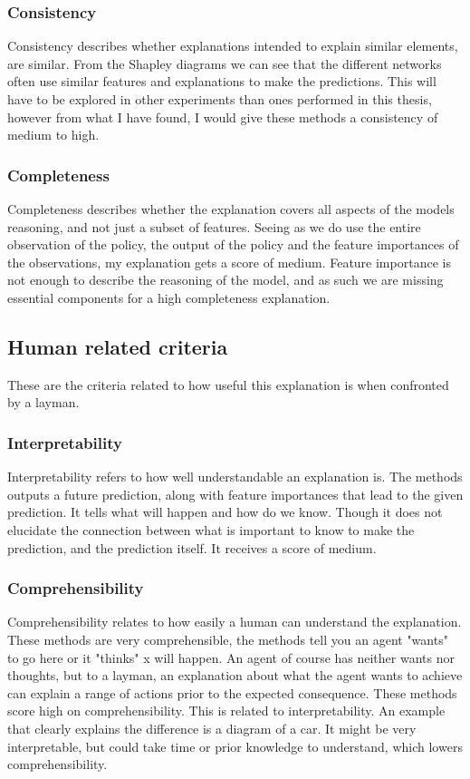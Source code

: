 \documentclass[UKenglish]{uiomasterthesis}
\begin{document}
\subsubsection{Consistency}
Consistency describes whether explanations intended to explain similar elements, are similar. From the Shapley diagrams we can see that the different networks often use similar features and explanations to make the predictions. This will have to be explored in other experiments than ones performed in this thesis, however from what I have found, I would give these methods a consistency of medium to high.

\subsubsection{Completeness}
Completeness describes whether the explanation covers all aspects of the models reasoning, and not just a subset of features. Seeing as we do use the entire observation of the policy, the output of the policy and the feature importances of the observations, my explanation gets a score of medium. Feature importance is not enough to describe the reasoning of the model, and as such we are missing essential components for a high completeness explanation.

\subsection{Human related criteria}
These are the criteria related to how useful this explanation is when confronted by a layman.

\subsubsection{Interpretability}
Interpretability refers to how well understandable an explanation is. The methods outputs a future prediction, along with feature importances that lead to the given prediction. It tells what will happen and how do we know. Though it does not elucidate the connection between what is important to know to make the prediction, and the prediction itself. It receives a score of medium.

\subsubsection{Comprehensibility}
Comprehensibility relates to how easily a human can understand the explanation. These methods are very comprehensible, the methods tell you an agent "wants" to go here or it "thinks" x will happen. An agent of course has neither wants nor thoughts, but to a layman, an explanation about what the agent wants to achieve can explain a range of actions prior to the expected consequence. These methods score high on comprehensibility. This is related to interpretability. An example that clearly explains the difference is a diagram of a car. It might be very interpretable, but could take time or prior knowledge to understand, which lowers comprehensibility.
\end{document}
